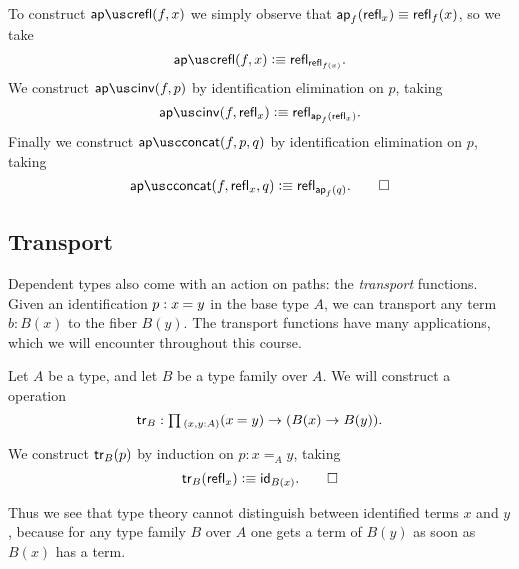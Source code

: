 \begin{constr}
To construct $\aprefl(f,x)$ we simply observe that ${\ap{f}{\refl{x}}}\jdeq {\refl{f}(x)}$, so we take
\begin{equation*}
\aprefl(f,x)\defeq\refl{\refl{f(x)}}.
\end{equation*}
We construct $\apinv(f,p)$ by identification elimination on $p$, taking
\begin{equation*}
\apinv(f,\refl{x}) \defeq \refl{\ap{f}{\refl{x}}}.
\end{equation*}
Finally we construct $\apconcat(f,p,q)$ by identification elimination on $p$, taking
\begin{equation*}
\apconcat(f,\refl{x},q)  \defeq \refl{\ap{f}{q}}.\qedhere
\end{equation*}
\end{constr}

\subsection{Transport}

Dependent types also come with an action on paths: the \emph{transport} functions.
Given an identification $p:\id{x}{y}$ in the base type $A$, we can transport any term $b:B(x)$ to the fiber $B(y)$.
The transport functions have many applications, which we will encounter throughout this course.

\begin{defn}
Let $A$ be a type, and let $B$ be a type family over $A$.
We will construct a  operation
\begin{equation*}
\tr_B:\prd*{x,y:A} (\id{x}{y})\to (B(x)\to B(y)).
\end{equation*}
\end{defn}

\begin{constr}
We construct $\tr_B(p)$ by induction on $p:x=_A y$, taking
\begin{equation*}
\tr_B(\refl{x}) \defeq \idfunc[B(x)].\qedhere
\end{equation*}
\end{constr}

Thus we see that type theory cannot distinguish between identified terms $x$ and $y$, because for any type family $B$ over $A$ one gets a term of $B(y)$ as soon as $B(x)$ has a term.

